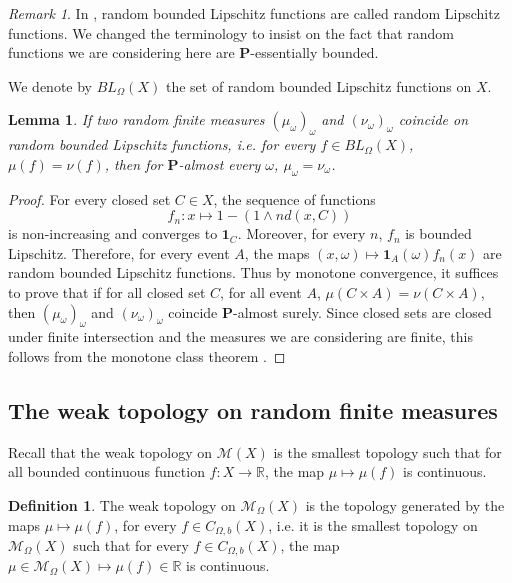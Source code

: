 \documentclass{amsart}
\newtheorem{lem}[thm]{Lemma}
\theoremstyle{definition}
\newtheorem{defn}[thm]{Definition}
\theoremstyle{remark}
\newtheorem{rem}[thm]{Remark}
\begin{document}
\begin{rem}
In \cite{Crauel}, random bounded Lipschitz functions are called random Lipschitz functions.
We changed the terminology to insist on the fact that random functions we are considering here are $\mathbf P$-essentially bounded.
\end{rem}
We denote by $BL_\Omega(X)$ the set of random bounded Lipschitz functions on $X$.

\begin{lem}\label{measuredeterminedbylipschitz}
If two random finite measures $(\mu_\omega)_\omega$ and $(\nu_\omega)_\omega$ coincide on random bounded Lipschitz functions, i.e. for every $f\in BL_\Omega(X)$, $\mu(f)=\nu(f)$, then for $\mathbf P$-almost every $\omega$, $\mu_\omega=\nu_\omega$.
\end{lem}

\begin{proof}
For every closed set $C\in X$, the sequence of functions
$$f_n:x\mapsto 1-(1\wedge nd(x,C))$$ is non-increasing and converges to $\mathbf 1_C$.
Moreover, for every $n$, $f_n$ is bounded Lipschitz.
Therefore, for every event $A$, the maps $(x,\omega)\mapsto \mathbf{1}_A(\omega)f_n(x)$ are random bounded Lipschitz functions.
Thus by monotone convergence, it suffices to prove that if for all closed set $C$, for all event $A$, $\mu(C\times A)=\nu(C\times A)$, then $(\mu_\omega)_\omega$ and $(\nu_\omega)_\omega$ coincide $\mathbf P$-almost surely.
Since closed sets are closed under finite intersection and the measures we are considering are finite, this follows from the monotone class theorem \cite[Theorem~3.4]{Bill86}.
\end{proof}


\subsection{The weak topology on random finite measures}

Recall that the weak topology on $\mathcal{M}(X)$ is the smallest topology such that for all bounded continuous function $f:X\to \mathbb R$, the map $\mu\mapsto \mu(f)$ is continuous.

\begin{defn}\label{defweaktopology}
The weak topology on $\mathcal{M}_\Omega(X)$ is the topology generated by the maps $\mu \mapsto \mu(f)$, for every $f\in C_{\Omega,b}(X)$, i.e. it is the smallest topology on $\mathcal{M}_\Omega(X)$ such that for every $f\in C_{\Omega,b}(X)$, the map $\mu\in \mathcal{M}_\Omega(X)\mapsto \mu(f)\in \mathbb R$ is continuous. 
\end{defn}
\end{document}
